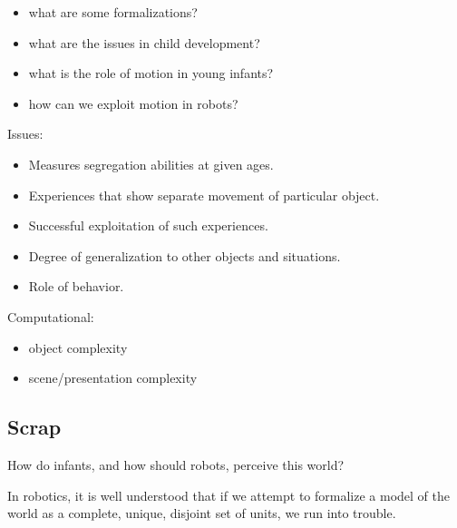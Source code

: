 \begin{itemize}

\item what are some formalizations?

\item what are the issues in child development?

\item what is the role of motion in young infants?

\item how can we exploit motion in robots?

\end{itemize}



Issues:

\begin{itemize}

\item Measures segregation abilities at given ages.

\item Experiences that show separate movement of particular object.

\item Successful exploitation of such experiences.

\item Degree of generalization to other objects and situations.

\item Role of behavior.

\end{itemize}

Computational:

\begin{itemize}

\item object complexity

\item scene/presentation complexity

\end{itemize}




\subsection{Scrap}


How do infants, and
how should robots, perceive this world?  

In robotics, it is well understood that if we attempt to formalize a
model of the world as a complete, unique, disjoint set of units, we
run into trouble. 

